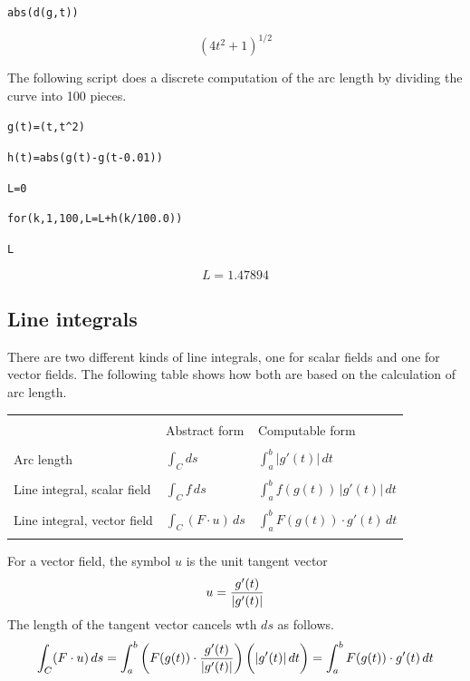 \medskip
\verb$abs(d(g,t))$

$$(4t^2+1)^{1/2}$$

\medskip
\noindent
The following script does a discrete computation of the arc length by dividing
the curve into 100 pieces.

\medskip
\verb$g(t)=(t,t^2)$

\verb$h(t)=abs(g(t)-g(t-0.01))$

\verb$L=0$

\verb$for(k,1,100,L=L+h(k/100.0))$

\verb$L$

$$L=1.47894$$

\newpage

\subsection{Line integrals}

There are two different kinds of line integrals,
one for scalar fields and one
for vector fields.
The following table shows how both are based on the calculation of
arc length.

\bigskip

\begin{center}
\begin{tabular}{|lll|}
\hline
 & & \\
& Abstract form
& Computable form
\\
 & & \\
Arc length
& $\displaystyle{\int_C ds}$
& $\displaystyle{\int_a^b |g'(t)|\,dt}$
\\
 & & \\
Line integral, scalar field
& $\displaystyle{\int_C f\,ds}$
& $\displaystyle{\int_a^b f(g(t))\,|g'(t)|\,dt}$
\\
 & & \\
Line integral, vector field
& $\displaystyle{\int_C(F\cdot u)\,ds}$
& $\displaystyle{\int_a^b F(g(t))\cdot g'(t)\,dt}$
\\
 & & \\
\hline
\end{tabular}
\end{center}

\bigskip
\noindent
For a vector field, the symbol $u$ is the unit tangent vector
$$u={g'(t)\over|g'(t)|}$$
The length of the tangent vector cancels wth $ds$
as follows.
$$\int_C(F\cdot u)\,ds
=\int_a^b\bigg(F(g(t))\cdot{g'(t)\over|g'(t)|}\bigg)\,\bigg(|g'(t)|\,dt\bigg)
=\int_a^b F(g(t))\cdot g'(t)\,dt
$$

\newpage

